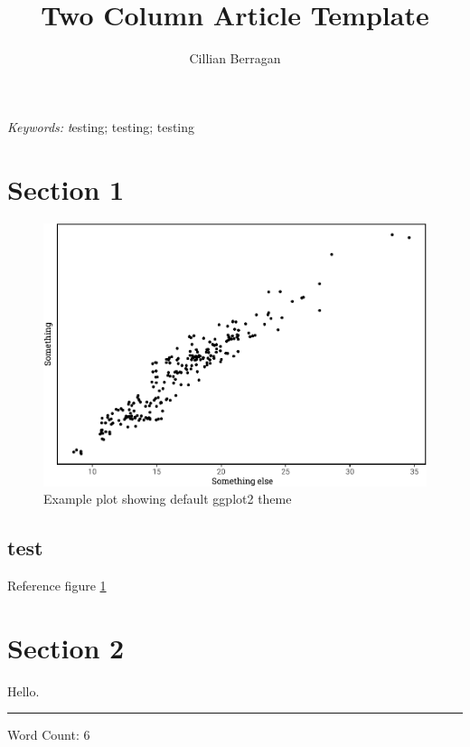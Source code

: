 \documentclass[a4paper, twocolumn, 10pt]{extarticle}
\title{Two Column Article Template}
\author{Cillian Berragan}
\makeatletter
\providecommand{\keywords}[1]{\footnotesize\textit{Keywords: }\normalfont\textit #1\selectfont}
\renewcommand\Authfont{\normalfont\sffamily\bfseries\fontsize{8}{8}\selectfont}
\newcommand{\absfont}{\sffamily\bfseries\fontsize{7}{7}\selectfont}
\newcommand{\datesfont}{\normalfont\sffamily\fontsize{6}{6}\selectfont}
\newcommand{\titlefont}{\normalfont\rmfamily\fontsize{22pt}{24pt}\selectfont}
\renewcommand{\maketitle}{\bgroup\setlength{\parindent}{0pt}
\begin{flushleft}
    \baselineskip=24pt \titlefont{\@title\par}
    \vskip 10pt
    \Authfont{\@author}
    \vskip 8pt
    \datesfont{This version was compiled on \@date}
    \vskip 8pt
\end{flushleft}\egroup
}
\makeatother
\begin{document}
\twocolumn[
    \maketitle

\author{Cillian Berragan}

\date{23 October, 2019}
]
{\setstretch{1.5}\absfont{\lipsum[1-1]}\par}
\keywords{testing; testing; testing}
\vskip 20pt

\hypertarget{section-1}{%
\section{Section 1}\label{section-1}}

\lipsum[1-2]

\begin{figure}[H]

{\centering \includegraphics[width=.75\linewidth]{skeleton_files/figure-latex/plot-1} 

}

\caption{Example plot showing default ggplot2 theme}\label{fig:plot}
\end{figure}

\hypertarget{test}{%
\subsection{test}\label{test}}

Reference figure \ref{fig:plot}

\lipsum[1-2]

\hypertarget{section-2}{%
\section{Section 2}\label{section-2}}

\lipsum[1-50]

Hello.

\nocite{tidyverse,devtools,Hmisc,PerformanceAnalytics,ggthemes,RStoolbox,broom,viridis,viridisLite,ggpubr,magrittr,sf,kableExtra,scales,lidR,raster,nvimcom,varhandle,future,rgdal,pbapply,cowplot,bibtex,benchmarkme,parallel,showtext,data.table,wesanderson}
\noindent

\rule{2cm}{0.4pt}

Word Count: 6


{\footnotesize}

\cleardoublepage
\end{document}
